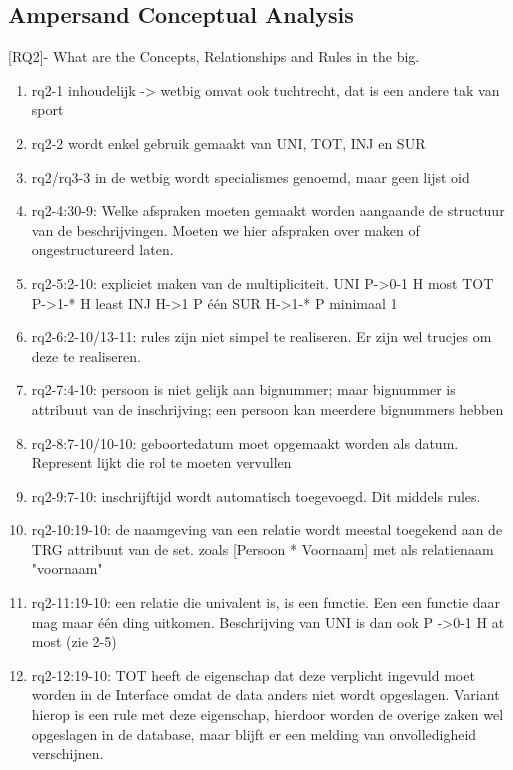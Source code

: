 \subsection{Ampersand Conceptual Analysis}
[RQ2]- What are the Concepts, Relationships and Rules in the \acrshort{big}.
\begin{enumerate}
    \item rq2-1 inhoudelijk -> wetbig omvat ook tuchtrecht, dat is een andere tak van sport
    \item rq2-2 wordt enkel gebruik gemaakt van UNI, TOT, INJ en SUR
    \item rq2/rq3-3 in de wetbig wordt specialismes genoemd, maar geen lijst oid
    \item rq2-4:30-9: Welke afspraken moeten gemaakt worden aangaande de structuur van de beschrijvingen. 
    Moeten we hier afspraken over maken of ongestructureerd laten.
    \item rq2-5:2-10: expliciet maken van de multipliciteit.\newline
    UNI P->0-1 H  most\newline
    TOT P->1-* H  least\newline
    INJ H->1 P    één\newline
    SUR H->1-* P  minimaal 1
    \item rq2-6:2-10/13-11: rules zijn niet simpel te realiseren. Er zijn wel trucjes om deze te realiseren.
    \item rq2-7:4-10: persoon is niet gelijk aan bignummer; maar bignummer is attribuut van de inschrijving; een persoon kan meerdere bignummers hebben
    \item rq2-8:7-10/10-10: geboortedatum moet opgemaakt worden als datum. Represent lijkt die rol te moeten vervullen
    \item rq2-9:7-10: inschrijftijd wordt automatisch toegevoegd. Dit middels rules.
    \item rq2-10:19-10: de naamgeving van een relatie wordt meestal toegekend aan de TRG attribuut van de set. zoals [Persoon * Voornaam] met als relatienaam "voornaam"
    \item rq2-11:19-10: een relatie die univalent is, is een functie. Een een functie daar mag maar één ding uitkomen. Beschrijving van UNI is dan ook P ->0-1 H at most (zie 2-5)
    \item rq2-12:19-10: TOT heeft de eigenschap dat deze verplicht ingevuld moet worden in de Interface omdat de data anders niet wordt opgeslagen. Variant hierop is een rule met deze eigenschap, hierdoor worden de overige zaken wel opgeslagen in de database, maar blijft er een melding van onvolledigheid verschijnen.

\end{enumerate}
